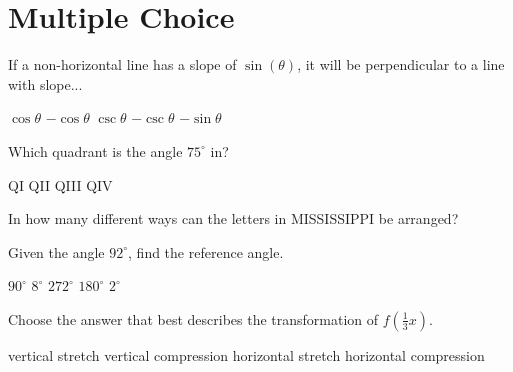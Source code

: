 \documentclass[../main.tex]{subfiles}
\begin{document}
\section*{Multiple Choice}
    \begin{questions}
    \setcounter{question}{0}
   
    \question[1] If a non-horizontal line has a slope of $\sin(\theta)$, it will be perpendicular to a line with slope...
    
    \begin{oneparchoices}
        \choice $\cos\theta$ 
        \choice $-\cos\theta$
        \choice $\csc\theta$
        \choice $-\csc\theta$
        \choice $-\sin\theta$
        \end{oneparchoices}  \answerline
    
    \question[1] Which quadrant is the angle $75^\circ$ in?

    \begin{oneparchoices}
        \choice QI 
        \choice QII
        \choice QIII
        \choice QIV
        \end{oneparchoices}  \answerline
        
    \question[1] In how many different ways can the letters in MISSISSIPPI be arranged?
    
    \begin{oneparchoices}
        \end{oneparchoices}  \answerline
        
    \question[1] Given the angle $92^\circ$, find the reference angle.
    
    \begin{oneparchoices}
        \choice $90^\circ$
        \choice $8^\circ$
        \choice $272^\circ$
        \choice $180^\circ$
        \choice $2^\circ$
        \end{oneparchoices}  \answerline
        
    \question[1] Choose the answer that best describes the transformation of $f(\frac{1}{3}x)$.
    
     \begin{oneparchoices}
        \choice vertical stretch
        \choice vertical compression
        \choice horizontal stretch
        \choice horizontal compression
        \end{oneparchoices}  \answerline
    

\end{questions}
\end{document}
